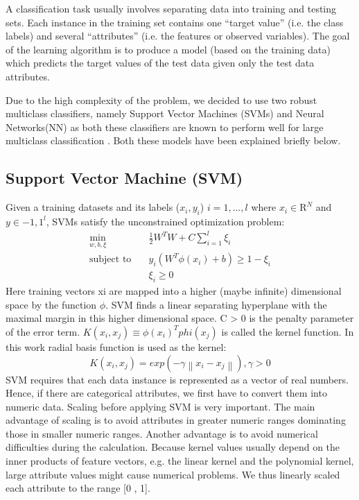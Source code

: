 \documentclass[letterpaper,12pt, onecolumn]{article}%
\begin{document}
A classification task usually involves separating data into training and testing sets. Each instance in the training set contains one \enquote{target value} (i.e. the class labels) and several \enquote{attributes} (i.e. the features or observed variables). The goal of the learning algorithm is to produce a model (based on the training data) which predicts the target values of the test data given only the test data attributes. 

Due to the high complexity of the problem, we decided to use two robust multiclass classifiers, namely Support Vector Machines (SVMs) and Neural Networks(NN) as both these classifiers are known to perform well for large multiclass classification \citep{jahanshahi2013innovative, csurka2004visual}. Both these models have been explained briefly below. 

\subsection{Support Vector Machine (SVM)}
\noindent
Given a training datasets and its labels ($x_i, y_i$) $i=1,\ldots,l$ where $x_i \in \mathrm{R}^N$ and $y \in {-1, 1}^l$, SVMs satisfy the unconstrained optimization problem:
\begin{equation}
\begin{split}
\min\limits_{w, b, \xi} \quad & \frac{1}{2} W^T W + C \sum\limits_{i=1}^{l} \xi_i \\
\text{subject to} \quad &y_i(W^T \phi(x_i)+b) \geq 1 - \xi_i \\
&\xi_i \geq 0
\end{split}
\end{equation}
Here training vectors xi are mapped into a higher (maybe infinite) dimensional space by the function $\phi$. SVM finds a linear separating hyperplane with the maximal margin in this higher dimensional space. C > 0 is the penalty parameter of the error term. $K(x_i, x_j) ≡ \phi(x_i)^T phi(x_j)$ is called the kernel function. In this work radial basis function is used as the kernel:
\begin{equation}
K(x_i, x_j) = exp(-\gamma \left\lVert x_i - x_j \right\rVert), \gamma > 0
\end{equation}
SVM requires that each data instance is represented as a vector of real numbers. Hence, if there are categorical attributes, we first have to convert them into numeric data. Scaling before applying SVM is very important. The main advantage of scaling is to avoid attributes in greater numeric ranges dominating those in smaller numeric ranges. Another advantage is to avoid numerical difficulties during the calculation. Because kernel values usually depend on the inner products of feature vectors, e.g. the linear kernel and the polynomial kernel, large attribute values might cause numerical problems. We thus linearly scaled each attribute to the range [0 , 1]. 
\end{document}
